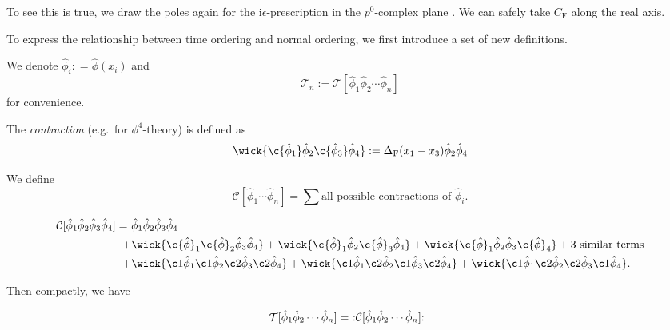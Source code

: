 \documentclass[a4paper,11pt]{article}
\begin{document}
	To see this is true, we draw the poles again for the $\mathrm{i}\epsilon$-prescription in the $p^0$-complex plane
	. We can safely take $C_\text{F}$ along the real axis.

	To express the relationship between time ordering and normal ordering, we first introduce a set of new definitions.

	We denote $\hat \phi_i : = \hat \phi(x_i)$ and 
	\[
		\mathcal{T}_n := \mathcal{T}[\hat \phi_1 \hat \phi_2 \cdots \hat \phi_n]
	\]
	for convenience.

	\begin{defi}
		The \emph{contraction} (e.g.\ for $\phi^4$-theory) is defined as 
		\[
			\wick{\c {\hat \phi_1} \hat \phi_2 \c {\hat \phi_3} \hat \phi_4} : = \Delta _{\text{F}}(x_1 - x_3) \hat \phi_2 \hat \phi_4
		\]
	\end{defi}

	\begin{defi}
		We define
		\[
			\mathcal{C}[\hat \phi_1 \cdots \hat \phi_n] = \sum \text{all possible contractions of }\hat \phi_i .
		\]
	\end{defi}

	\begin{ex}
		\begin{align*}
			\mathcal{C}[\hat \phi_1 \hat \phi_2 \hat \phi_3 \hat \phi_4] =\ & \hat \phi_1 \hat \phi_2 \hat \phi_3 \hat \phi_4 \\
			+ &\wick{\c {\hat{\phi}}_1 \c {\hat{\phi}}_2 \hat \phi_3 \hat \phi_4} + \wick{\c {\hat \phi}_1 \hat \phi_2 \c{\hat \phi}_3 \hat \phi_4} + \wick{\c{\hat \phi}_1 \hat \phi_2 \hat \phi_3 \c{\hat \phi}_4} +  \text{3 similar terms}\\
			+ & \wick{\c1 {\hat{\phi}}_1 \c1 {\hat{\phi}}_2 \c2{\hat \phi}_3 \c2{\hat \phi}_4} + \wick{\c1 {\hat{\phi}}_1 \c2 {\hat{\phi}}_2 \c1{\hat \phi}_3 \c2{\hat \phi}_4} + \wick{\c1 {\hat{\phi}}_1 \c2 {\hat{\phi}}_2 \c2{\hat \phi}_3 \c1{\hat \phi}_4}.
		\end{align*}
	\end{ex}
	Then compactly, we have
	\begin{thm}
		\[
			\mathcal{T}[\hat \phi_1 \hat \phi_2 \cdots \hat \phi_n] =\ :\mathrel{\mathcal{C}[\hat \phi_1 \hat \phi_2 \cdots \hat \phi_n]}:.
		\]
	\end{thm}
\end{document}
